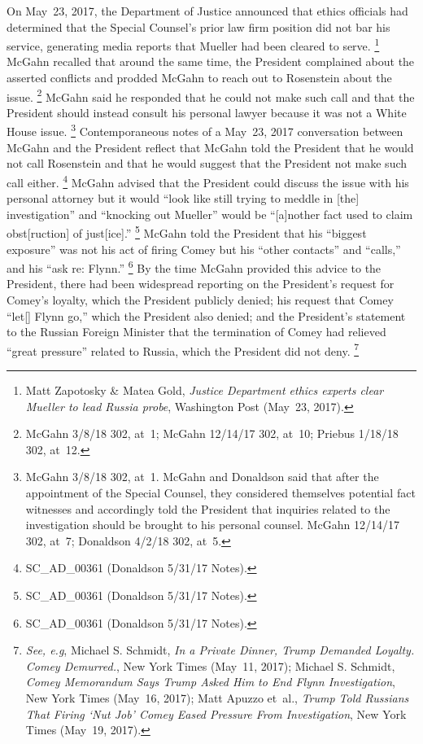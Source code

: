 On May~23, 2017, the Department of Justice announced that ethics officials had determined that the Special Counsel's prior law firm position did not bar his service, generating media reports that Mueller had been cleared to serve.%
\footnote{Matt Zapotosky \& Matea Gold, \textit{Justice Department ethics experts clear Mueller to lead Russia probe}, Washington Post (May~23, 2017).}
McGahn recalled that around the same time, the President complained about the asserted conflicts and prodded McGahn to reach out to Rosenstein about the issue.%
\footnote{McGahn 3/8/18 302, at~1;
McGahn 12/14/17 302, at~10;
Priebus 1/18/18 302, at~12.}
McGahn said he responded that he could not make such call and that the President should instead consult his personal lawyer because it was not a White House issue.%
\footnote{McGahn 3/8/18 302, at~1.
McGahn and Donaldson said that after the appointment of the Special Counsel, they considered themselves potential fact witnesses and accordingly told the President that inquiries related to the investigation should be brought to his personal counsel.
McGahn 12/14/17 302, at~7;
Donaldson 4/2/18 302, at~5.}
Contemporaneous notes of a May~23, 2017 conversation between McGahn and the President reflect that McGahn told the President that he would not call Rosenstein and that he would suggest that the President not make such call either.%
\footnote{SC\_AD\_00361 (Donaldson 5/31/17 Notes).}
McGahn advised that the President could discuss the issue with his personal attorney but it would ``look like still trying to meddle in [the] investigation'' and ``knocking out Mueller'' would be ``[a]nother fact used to claim obst[ruction] of just[ice].''%
\footnote{SC\_AD\_00361 (Donaldson 5/31/17 Notes).}
McGahn told the President that his ``biggest exposure'' was not his act of firing Comey but his ``other contacts'' and ``calls,'' and his ``ask re: Flynn.''%
\footnote{SC\_AD\_00361 (Donaldson 5/31/17 Notes).}
By the time McGahn provided this advice to the President, there had been widespread reporting on the President's request for Comey's loyalty, which the President publicly denied;
his request that Comey ``let[] Flynn go,'' which the President also denied;
and the President's statement to the Russian Foreign Minister that the termination of Comey had relieved ``great pressure'' related to Russia, which the President did not deny.%
\footnote{\textit{See, e.g}, Michael S. Schmidt, \textit{In a Private Dinner, Trump Demanded Loyalty. Comey Demurred.}, New York Times (May~11, 2017);
Michael S. Schmidt, \textit{Comey Memorandum Says Trump Asked Him to End Flynn Investigation}, New York Times (May~16, 2017);
Matt Apuzzo et~al., \textit{Trump Told Russians That Firing `Nut Job' Comey Eased Pressure From Investigation}, New York Times (May~19, 2017).}

